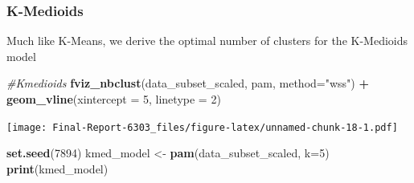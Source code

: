 \documentclass[
]{article}
\newenvironment{Shaded}{\begin{snugshade}}{\end{snugshade}}
\newcommand{\AttributeTok}[1]{\textcolor[rgb]{0.13,0.29,0.53}{#1}}
\newcommand{\CommentTok}[1]{\textcolor[rgb]{0.56,0.35,0.01}{\textit{#1}}}
\newcommand{\DecValTok}[1]{\textcolor[rgb]{0.00,0.00,0.81}{#1}}
\newcommand{\FunctionTok}[1]{\textcolor[rgb]{0.13,0.29,0.53}{\textbf{#1}}}
\newcommand{\NormalTok}[1]{#1}
\newcommand{\OtherTok}[1]{\textcolor[rgb]{0.56,0.35,0.01}{#1}}
\newcommand{\SpecialCharTok}[1]{\textcolor[rgb]{0.81,0.36,0.00}{\textbf{#1}}}
\newcommand{\StringTok}[1]{\textcolor[rgb]{0.31,0.60,0.02}{#1}}
\begin{document}
\subsubsection{K-Medioids}\label{k-medioids}

Much like K-Means, we derive the optimal number of clusters for the
K-Medioids model

\begin{Shaded}
\begin{Highlighting}[]
\CommentTok{\#Kmedioids}
\FunctionTok{fviz\_nbclust}\NormalTok{(data\_subset\_scaled, pam, }\AttributeTok{method=}\StringTok{"wss"}\NormalTok{) }\SpecialCharTok{+}
  \FunctionTok{geom\_vline}\NormalTok{(}\AttributeTok{xintercept =} \DecValTok{5}\NormalTok{, }\AttributeTok{linetype =} \DecValTok{2}\NormalTok{)}
\end{Highlighting}
\end{Shaded}

\texttt{[image: Final-Report-6303\_files/figure-latex/unnamed-chunk-18-1.pdf]}

\begin{Shaded}
\begin{Highlighting}[]
\FunctionTok{set.seed}\NormalTok{(}\DecValTok{7894}\NormalTok{)}
\NormalTok{kmed\_model }\OtherTok{\textless{}{-}} \FunctionTok{pam}\NormalTok{(data\_subset\_scaled, }\AttributeTok{k=}\DecValTok{5}\NormalTok{)}
\FunctionTok{print}\NormalTok{(kmed\_model)}
\end{Highlighting}
\end{Shaded}
\end{document}
